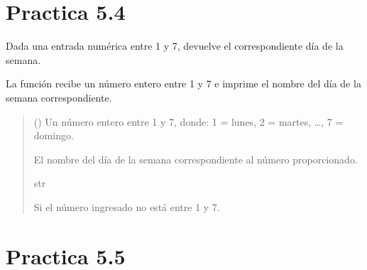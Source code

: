\documentclass[letterpaper,10pt,spanish]{sphinxmanual}
\begin{document}
\section{Practica 5.4}
\label{\detokenize{pr5:module-pr5.4}}\label{\detokenize{pr5:practica-5-4}}

\begin{fulllineitems}
\label{\detokenize{pr5:pr5.4.dia_de_la_semana}}
\pysigstartsignatures
{}
\pysigstopsignatures
\sphinxAtStartPar
Dada una entrada numérica entre 1 y 7, devuelve el correspondiente día de la semana.

\sphinxAtStartPar
La función recibe un número entero entre 1 y 7 e imprime el nombre del día de la semana correspondiente.
\begin{quote}\begin{description}
\sphinxAtStartPar
{} () \textendash{} Un número entero entre 1 y 7, donde:
1 = lunes, 2 = martes, …, 7 = domingo.

\sphinxAtStartPar
El nombre del día de la semana correspondiente al número proporcionado.

\sphinxAtStartPar
str

\sphinxAtStartPar
{} \textendash{} Si el número ingresado no está entre 1 y 7.

\end{description}\end{quote}

\end{fulllineitems}



\section{Practica 5.5}
\label{\detokenize{pr5:module-pr5.5}}\label{\detokenize{pr5:practica-5-5}}
\end{document}
